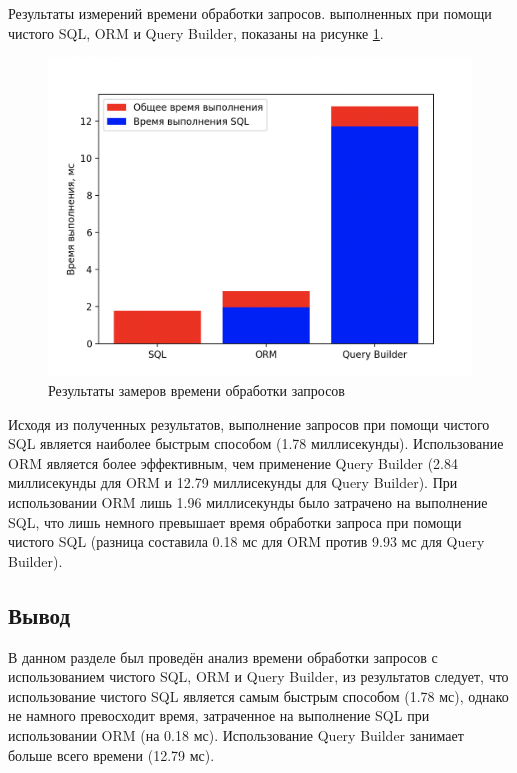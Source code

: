 Результаты измерений  времени обработки запросов. выполненных при помощи чистого SQL, ORM и Query Builder, показаны на рисунке \ref{fig:research}.

\begin{figure}[h]
	\centering
	\captionsetup{justification=centering}
	\includegraphics[width=130mm]{img/research.png}
	\caption{Результаты замеров времени обработки запросов}
	\label{fig:research}
\end{figure}


Исходя из полученных результатов, выполнение запросов при помощи чистого SQL является наиболее быстрым способом (1.78 миллисекунды). Использование ORM является более эффективным, чем применение Query Builder (2.84 миллисекунды для ORM и 12.79 миллисекунды для Query Builder). При использовании ORM лишь 1.96 миллисекунды было затрачено на выполнение SQL, что лишь немного превышает время обработки запроса при помощи чистого SQL (разница составила 0.18 мс для ORM против 9.93 мс для Query Builder).

\subsection*{Вывод}
В данном разделе был проведён анализ времени обработки запросов с использованием чистого SQL, ORM и Query Builder, из результатов следует, что использование чистого SQL является самым быстрым способом (1.78 мс), однако не намного превосходит время, затраченное на выполнение SQL при использовании ORM (на 0.18 мс). Использование Query Builder занимает больше всего времени (12.79 мс).





